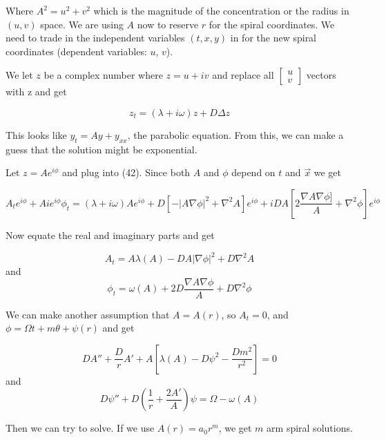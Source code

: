 \documentclass[]{article}
\numberwithin{equation}{section}		%
\begin{document}
Where $A^2=u^2+v^2$ which is the magnitude of the concentration or the radius in $(u,v)$ space.  We are using $A$ now to reserve $r$ for the spiral coordinates.  We need to trade in the independent variables $(t,x,y)$ in for the new spiral coordinates (dependent variables: $u$, $v$).

\noindent We let $z$ be a complex number where $z=u+iv$ and replace all
$\begin{bmatrix}
u\\
v
\end{bmatrix}$
vectors with z and get

\begin{equation}
	z_t=(\lambda+i\omega)z+D\Delta z
\end{equation}

This looks like $y_t=Ay+y_{xx}$, the parabolic equation. From this, we can make a guess that the solution might be exponential.


\noindent Let $z=Ae^{i\phi}$ and plug into (42). Since both $A$ and $\phi$ depend on $t$ and $\vec{x}$ we get

\begin{equation}
	A_te^{i\phi}+Aie^{i\phi}\phi_t=(\lambda+i\omega)Ae^{i\phi}+D[-|A\nabla\phi|^2+\nabla^2A]e^{i\phi}+iDA[2\frac{\nabla A\nabla\phi]}{A}+\nabla^2\phi]e^{i\phi}
\end{equation}

\noindent Now equate the real and imaginary parts and get

\begin{equation}
	A_t=A\lambda(A)-DA|\nabla\phi|^2+D\nabla^2A
\end{equation}
and
\begin{equation}
	\phi_t=\omega(A)+2D\frac{\nabla A \nabla\phi}{A}+D\nabla^2\phi
\end{equation}

\noindent We can make another assumption that $A=A(r)$, so $A_t=0$, and $\phi=\Omega t+m\theta+\psi(r)$ and get

\begin{equation}
	DA''+\frac{D}{r}A'+A[\lambda(A)-D\psi^2-\frac{Dm^2}{r^2}]=0
\end{equation}
and
\begin{equation}
    D\psi''+D(\frac{1}{r}+\frac{2A'}{A})\psi =\Omega-\omega(A)
\end{equation}


Then we can try to solve. If we use $A(r)=a_0r^m$, we get $m$ arm spiral solutions.
\end{document}
